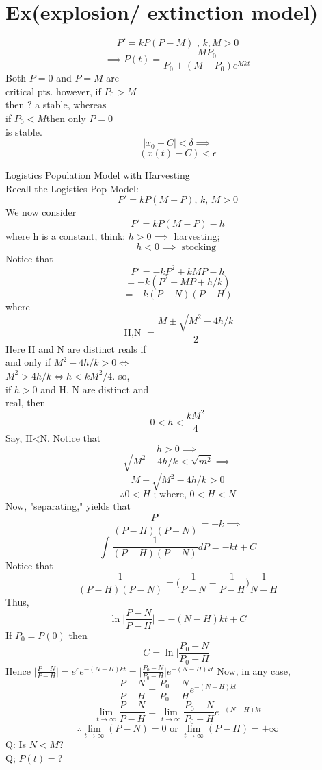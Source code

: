 \documentclass[10pt,a4paper]{article}
\begin{document}
\section*{Ex(explosion/ extinction model)}
  \[ P' = kP(P-M) \text{ , } k, M>0\]
  \[ \implies P(t) = \frac{MP_0}{P_0 + (M-P_0)e^{Mkt}} \]
  Both \( P=0 \) and \( P=M  \) are \\
  critical pts. however, if \( P_0 > M \) \\
  then ? a stable, whereas \\
  if \( P_0 <M  \)then only \( P=0 \) \\
  is stable.
  \[ |x_0 - C| < \delta  \implies  \]
  \[ (x(t) -C) < \epsilon  \]


  \newpage 
  Logistics Population Model with  Harvesting \\
  Recall the Logistics Pop Model: 
  \[ P' = kP(M-P) \text{, }k \text{, } M>0  \]
  We now consider
  \[ P' = kP(M-P)-h \]
  where h is a constant, think: \( h>0 \implies \) harvesting; \\
  \[ h<0 \implies \text{ stocking } \]
  Notice that 
  \[ P' = -kP^2 + kMP -h \]
  \[ =-k(P^2 -MP + h/k) \]
  \[ = -k(P-N)(P-H) \]
  where
  \[ \text{ H,N  } = \frac{M \pm \sqrt{M^2 -4h/k}}{2} \]
  Here H and N are distinct reals if  \\
  and only if \( M^2 -4h/k > 0 \iff \) \\
  \( M^2 >4h/k \iff h<kM^2/4 \). so,  \\
  if \( h>0 \) and H, N are distinct and  \\
  real, then 
  \[ 0 < h< \frac{kM^2}{4} \]
  Say, H<N. Notice that 
  \[ h>0 \implies \]
  \[ \sqrt{M^2 -4h/k} <  \sqrt{m^2} \implies  \]
  \[ M- \sqrt{M^2 - 4h/k} > 0 \]
  \[ \therefore 0<H \text{ ; where,  } 0< H < N  \]
  Now, "separating,"  yields that 
  \[ \frac{P'}{(P-H)(P-N)} = -k \implies \]
  \[ \int \frac{1}{(P-H)(P-N)}dP = -kt + C  \]
  Notice that 
  \[ \frac{1}{(P-H)(P-N)}= \bigg(\frac{1}{P-N} - \frac{1}{P-H}\bigg) \frac{1}{N-H} \]
  Thus, 
  \[ \ln \bigg| \frac{P-N}{P-H}\bigg| = -(N-H)kt + C \]
  If \( P_0 = P(0)  \) then
  \[  C = \ln \bigg| \frac{P_0-N}{P_0-H}\bigg| \]
  Hence \(  \big| \frac{P-N}{P-H}\big| = e^c e^{-(N-H)kt} = \big| \frac{P_0-N}{P_0-H}\big| e^{-(N-H)kt}\)
  Now, in any case, 
  \[ \frac{P-N}{P-H} =  \frac{P_0-N}{P_0-H} e^{-(N-H)kt}\]
  \[ \lim_{t \to \infty} \frac{P-N}{P-H} = \lim_{t \to \infty} \frac{P_0-N}{P_0-H} e^{-(N-H)kt}	 \]
  \[ \therefore \lim_{t \to \infty}(P-N) =0 \text{ or } \lim_{t \to
  \infty} (P-H) = \pm  \infty  \]
  Q: Is \( N<M \)? \\
  Q; \( P(t) =  \)?
\end{document}
